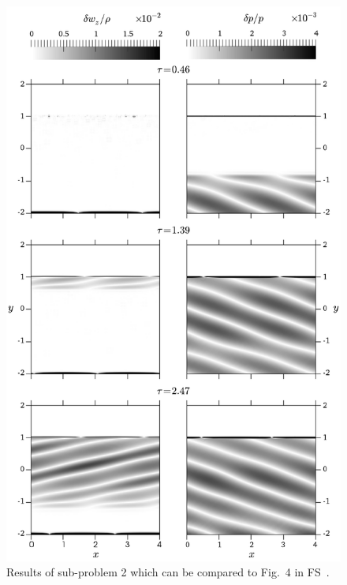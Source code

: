 \begin {figure}
\centering
\includegraphics[width=12cm]{figures/TP2}
\caption {Results of sub-problem 2 which can be compared to Fig.~4 in FS~\cite{Sato2009}.}
\label{fig:TP2}
\end{figure}
